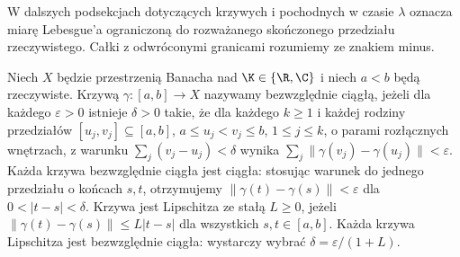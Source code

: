 W dalszych podsekcjach dotyczących krzywych i pochodnych
w czasie $\lambda$ oznacza miarę Lebesgue'a ograniczoną
do rozważanego skończonego przedziału rzeczywistego. Całki z odwróconymi
granicami rozumiemy ze znakiem minus.

\begin{definicja}
\label{def:ac-curve15b}
Niech $X$ będzie przestrzenią Banacha nad $\K\in\{\R,\C\}$
i niech $a<b$ będą rzeczywiste. Krzywą $\gamma:[a,b]\to X$
nazywamy bezwzględnie ciągłą, jeżeli dla każdego
$\varepsilon>0$ istnieje $\delta>0$ takie, że dla każdego
$k\ge1$ i każdej rodziny przedziałów $[u_j,v_j]\subseteq[a,b]$,
$a\le u_j<v_j\le b$, $1\le j\le k$, o parami rozłącznych
wnętrzach, z warunku
$\sum_j(v_j-u_j)<\delta$ wynika
$\sum_j\|\gamma(v_j)-\gamma(u_j)\|<\varepsilon$.
Każda krzywa bezwzględnie ciągła jest ciągła: stosując
warunek do jednego przedziału o końcach $s,t$, otrzymujemy
$\|\gamma(t)-\gamma(s)\|<\varepsilon$ dla $0<|t-s|<\delta$.
Krzywa jest Lipschitza ze stałą $L\ge0$, jeżeli
$\|\gamma(t)-\gamma(s)\|\le L|t-s|$ dla wszystkich
$s,t\in[a,b]$. Każda krzywa Lipschitza jest bezwzględnie
ciągła: wystarczy wybrać $\delta=\varepsilon/(1+L)$.
\end{definicja}

